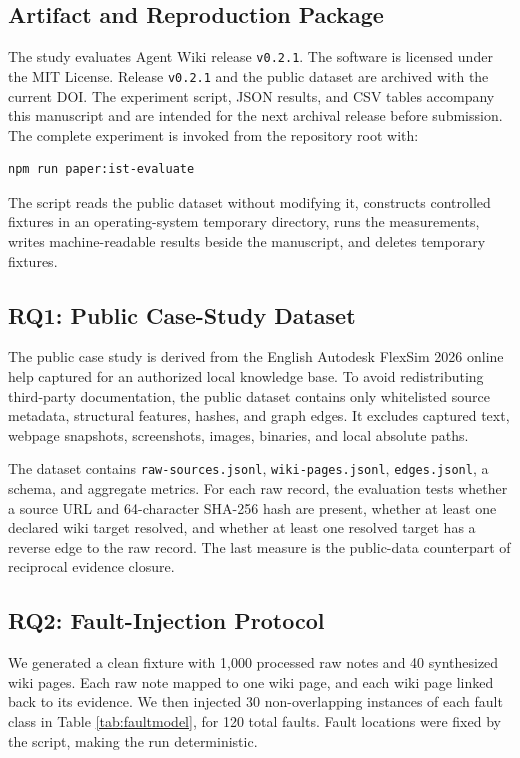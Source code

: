 \documentclass[preprint,12pt,a4paper]{elsarticle}
\begin{document}
\subsection{Artifact and Reproduction Package}

The study evaluates Agent Wiki release \texttt{v0.2.1}. The software is
licensed under the MIT License. Release \texttt{v0.2.1} and the public dataset
are archived with the current DOI. The experiment script, JSON results, and CSV
tables accompany this manuscript and are intended for the next archival release
before submission. The complete experiment is invoked from the repository root
with:

\begin{verbatim}
npm run paper:ist-evaluate
\end{verbatim}

The script reads the public dataset without modifying it, constructs controlled
fixtures in an operating-system temporary directory, runs the measurements,
writes machine-readable results beside the manuscript, and deletes temporary
fixtures.

\subsection{RQ1: Public Case-Study Dataset}

The public case study is derived from the English Autodesk FlexSim 2026 online
help captured for an authorized local knowledge base. To avoid redistributing
third-party documentation, the public dataset contains only whitelisted source
metadata, structural features, hashes, and graph edges. It excludes captured
text, webpage snapshots, screenshots, images, binaries, and local absolute
paths.

The dataset contains \texttt{raw-sources.jsonl}, \texttt{wiki-pages.jsonl},
\texttt{edges.jsonl}, a schema, and aggregate metrics. For each raw record, the
evaluation tests whether a source URL and 64-character SHA-256 hash are present,
whether at least one declared wiki target resolved, and whether at least one
resolved target has a reverse edge to the raw record. The last measure is the
public-data counterpart of reciprocal evidence closure.

\subsection{RQ2: Fault-Injection Protocol}

We generated a clean fixture with 1,000 processed raw notes and 40 synthesized
wiki pages. Each raw note mapped to one wiki page, and each wiki page linked back
to its evidence. We then injected 30 non-overlapping instances of each fault
class in Table \ref{tab:faultmodel}, for 120 total faults. Fault locations were
fixed by the script, making the run deterministic.
\end{document}
